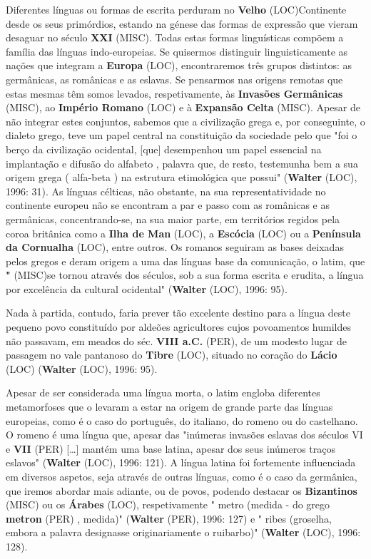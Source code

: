 \documentclass[12pt,a4paper]{article}
\begin{document}
Diferentes  línguas  ou  formas  de  escrita  perduram  no  \textbf{Velho} (LOC)Continente  desde  os  seus primórdios, estando na génese das formas de expressão que vieram desaguar no século \textbf{XXI} (MISC). Todas estas formas linguísticas compõem a família das línguas indo-europeias. Se quisermos distinguir linguisticamente as nações que integram a \textbf{Europa} (LOC), encontraremos três grupos distintos: as germânicas, as românicas e as eslavas. Se pensarmos nas origens remotas que estas mesmas têm somos levados, respetivamente, às \textbf{Invasões Germânicas} (MISC), ao \textbf{Império Romano} (LOC) e à \textbf{Expansão Celta} (MISC). Apesar de não integrar estes conjuntos, sabemos que  a  civilização  grega  e,  por  conseguinte,  o  dialeto  grego,  teve  um  papel  central  na constituição  da  sociedade  pelo  que  "foi  o  berço  da  civilização  ocidental,  [que] desempenhou um papel essencial na implantação e difusão do alfabeto , palavra que, de resto, testemunha bem a sua origem grega ( alfa-beta ) na estrutura etimológica que possui" (\textbf{Walter} (LOC),  1996:  31).  As  línguas  célticas,  não  obstante,  na  sua  representatividade  no continente europeu não se encontram a par e passo com as românicas e as germânicas, concentrando-se, na sua maior parte, em territórios regidos pela coroa britânica como a \textbf{Ilha de Man} (LOC), a \textbf{Escócia} (LOC) ou a \textbf{Península da Cornualha} (LOC), entre outros. Os romanos seguiram as bases deixadas pelos gregos e deram origem a uma das línguas base da comunicação, o latim, que \textbf{"} (MISC)se tornou através dos séculos, sob a sua forma escrita e erudita, a língua por excelência da cultural ocidental" (\textbf{Walter} (LOC), 1996: 95).

Nada à partida, contudo, faria prever tão excelente destino para a língua deste pequeno povo constituído por aldeões agricultores cujos povoamentos humildes não passavam, em meados do séc. \textbf{VIII a.C.} (PER), de um modesto lugar de passagem no vale pantanoso do \textbf{Tibre} (LOC), situado no coração do \textbf{Lácio} (LOC) (\textbf{Walter} (LOC), 1996: 95).

Apesar  de  ser  considerada  uma  língua  morta,  o  latim  engloba  diferentes metamorfoses  que  o  levaram  a  estar  na  origem  de  grande  parte  das  línguas  europeias, como é o caso do português, do italiano, do romeno ou do castelhano. O romeno é uma língua que, apesar das "inúmeras invasões eslavas dos séculos VI e \textbf{VII} (PER) […] mantém uma base latina, apesar dos seus inúmeros traços eslavos" (\textbf{Walter} (LOC), 1996: 121). A língua latina foi fortemente influenciada em diversos aspetos, seja através de outras línguas, como é o caso da germânica, que iremos abordar mais adiante, ou de povos, podendo destacar os \textbf{Bizantinos} (MISC)  ou  os  \textbf{Árabes} (LOC),  respetivamente  " metro (medida  -  do  grego \textbf{metron} (PER) , medida)"  (\textbf{Walter} (PER),  1996:  127)  e  " ribes (groselha,  embora  a  palavra  designasse originariamente o ruibarbo)" (\textbf{Walter} (LOC), 1996: 128).
\end{document}
